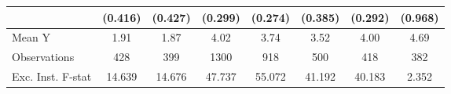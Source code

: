{\begin{tabular}{l*{7}{c}}
            &     (0.416)         &     (0.427)         &     (0.299)         &     (0.274)         &     (0.385)         &     (0.292)         &     (0.968)         \\
\midrule
Mean Y      &        1.91         &        1.87         &        4.02         &        3.74         &        3.52         &        4.00         &        4.69         \\
Observations&         428         &         399         &        1300         &         918         &         500         &         418         &         382         \\
Exc. Inst. F-stat&      14.639         &      14.676         &      47.737         &      55.072         &      41.192         &      40.183         &       2.352         \\
\bottomrule
\end{tabular}
}
